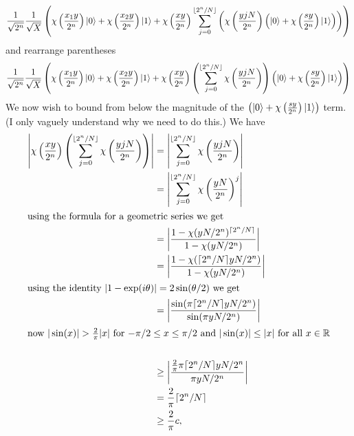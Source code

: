 \documentclass[10pt]{article}
\theoremstyle{plain}
\theoremstyle{definition}
\newcommand{\R}{\mathbb{R}}
\begin{document}
\[
    \frac{1}{\sqrt{2^n}}\frac{1}{\sqrt{X}} \left(\chi\left(\frac{x_1y}{ 2^n}\right)\ket{0} + \chi\left(\frac{x_2y}{ 2^n}\right) \ket{1} + \chi\left(\frac{xy}{2^n}\right)
    \sum_{j = 0}^{\lfloor 2^n / N \rfloor }
    \left(
        \chi\left(\frac{yjN}{2^n}\right) \left( \ket{0}  +    \chi\left(\frac{sy}{2^n}\right)  \ket{1} \right) \right)\right)
\]
and rearrange parentheses
\[
    \frac{1}{\sqrt{2^n}}\frac{1}{\sqrt{X}} \left(\chi\left(\frac{x_1y}{ 2^n}\right)\ket{0}
    + \chi\left(\frac{x_2y}{ 2^n}\right) \ket{1}
    + \chi\left(\frac{xy}{2^n}\right)
    \left(
        \sum_{j = 0}^{\lfloor 2^n / N \rfloor }
        \chi\left(\frac{yjN}{2^n}\right)
        \right)
    \left( \ket{0}  +    \chi\left(\frac{sy}{2^n}\right)  \ket{1} \right)\right)
\]
We now wish to bound from below the magnitude of the \( \left( \ket{0}  +    \chi\left(\frac{sy}{2^n}\right)  \ket{1} \right) \) term.
{
\color{red} (I only vaguely understand why we need to do this.)
}
We have
\begin{align*}
    \left | \chi\left(\frac{xy}{2^n}\right)\left(\sum_{j = 0}^{\lfloor 2^n / N \rfloor }\chi\left(\frac{yjN}{2^n}\right)\right) \right|
      & =  \left | \sum_{j = 0}^{\lfloor 2^n / N \rfloor }\chi\left(\frac{yjN}{2^n}\right) \right|     \\
      & = \left | \sum_{j = 0}^{\lfloor 2^n / N \rfloor }\chi\left(\frac{yN}{2^n}\right)^j \right|     \\
    \intertext{using the formula for a geometric series we get}
      & = \left | \frac{1-\chi(yN / 2^n )^{\lceil 2^n / N \rceil}}{1 - \chi(yN/2^n)} \right|           \\
      & = \left | \frac{1-\chi(\lceil 2^n / N \rceil yN / 2^n )}{1 - \chi(yN/2^n)} \right|             \\
    \intertext{using the identity \( |1-\exp(i\theta)| = 2\sin(\theta / 2) \) we get }
      & = \left | \frac{\sin(\pi \lceil 2^n / N \rceil yN / 2^{n} )}{\sin( \pi yN/2^{n})} \right|      \\
    \intertext{now \( |\sin(x)| > \frac{2}{\pi}|x| \) for \( -\pi / 2 \leq x \leq \pi / 2 \) and \( |\sin(x)| \leq |x| \) for all \( x \in \R \)} \\
      & \geq \left | \frac{\frac{2}{\pi} \pi \lceil 2^n / N \rceil yN / 2^{n} }{ \pi yN/2^{n}} \right| \\
      & = \frac{2}{\pi} \lceil 2^n / N \rceil                                                          \\
      & \geq \frac{2}{\pi} c,
\end{align*}
\end{document}
